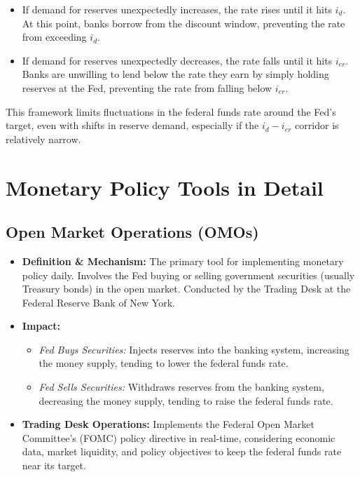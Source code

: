 \begin{itemize}
\begin{itemize}
            \item If demand for reserves unexpectedly increases, the rate rises until it hits $i_d$. At this point, banks borrow from the discount window, preventing the rate from exceeding $i_d$.
            \item If demand for reserves unexpectedly decreases, the rate falls until it hits $i_{er}$. Banks are unwilling to lend below the rate they earn by simply holding reserves at the Fed, preventing the rate from falling below $i_{er}$.
        \end{itemize}
    This framework limits fluctuations in the federal funds rate around the Fed's target, even with shifts in reserve demand, especially if the $i_d - i_{er}$ corridor is relatively narrow.
\end{itemize}

\section{Monetary Policy Tools in Detail}

\subsection{Open Market Operations (OMOs)}
\begin{itemize}
    \item \textbf{Definition \& Mechanism:} The primary tool for implementing monetary policy daily. Involves the Fed buying or selling government securities (usually Treasury bonds) in the open market. Conducted by the Trading Desk at the Federal Reserve Bank of New York.
    \item \textbf{Impact:}
        \begin{itemize}
            \item \textit{Fed Buys Securities:} Injects reserves into the banking system, increasing the money supply, tending to lower the federal funds rate.
            \item \textit{Fed Sells Securities:} Withdraws reserves from the banking system, decreasing the money supply, tending to raise the federal funds rate.
        \end{itemize}
    \item \textbf{Trading Desk Operations:} Implements the Federal Open Market Committee's (FOMC) policy directive in real-time, considering economic data, market liquidity, and policy objectives to keep the federal funds rate near its target.
\end{itemize}

